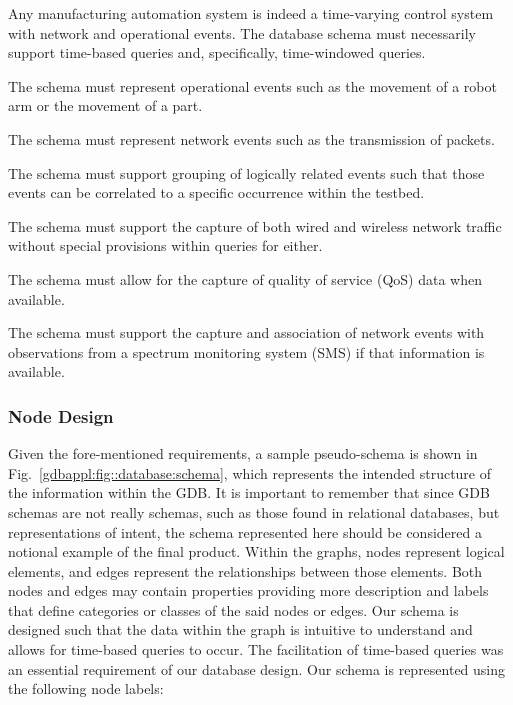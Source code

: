 \begin{description}[style=sameline]
\item[Time] Any manufacturing automation system is indeed a time-varying control system with network and operational events.  The database schema must necessarily support time-based queries and, specifically, time-windowed 
queries.
\item[Operational Events] The schema must represent operational events such as the movement of a robot arm or the movement of a part.
\item[Network Events] The schema must represent network events such as the transmission of packets.
\item[Message Grouping]  The schema must support grouping of logically related events such that those events can be correlated to a specific occurrence within the testbed.
\item[Wireless Support] The schema must support the capture of both wired and wireless network traffic without special provisions within queries for either.
\item[QoS Support] The schema must allow for the capture of quality of service (QoS) data when available.
\item[Spectrum Monitoring] The schema must support the capture and association of network events with observations from a spectrum monitoring system (SMS) if that information is available.
\end{description}

\subsubsection{Node Design}

Given the fore-mentioned requirements, a sample pseudo-schema is shown in Fig.~\ref{gdbappl:fig::database:schema}, which represents the intended structure of the information within the GDB. It is important to remember that since GDB schemas are not really schemas, such as those found in relational databases, but representations of intent, the schema represented here should be considered a notional example of the final product.  Within the graphs, nodes represent logical elements, and edges represent the relationships between those elements.  Both nodes and edges may contain properties providing more description and labels that define categories or classes of the said nodes or edges.  Our schema is designed such that the data within the graph is intuitive to understand and allows for time-based queries to occur.  The facilitation of time-based queries was an essential requirement of our database design.  Our schema is represented using the following node labels:

